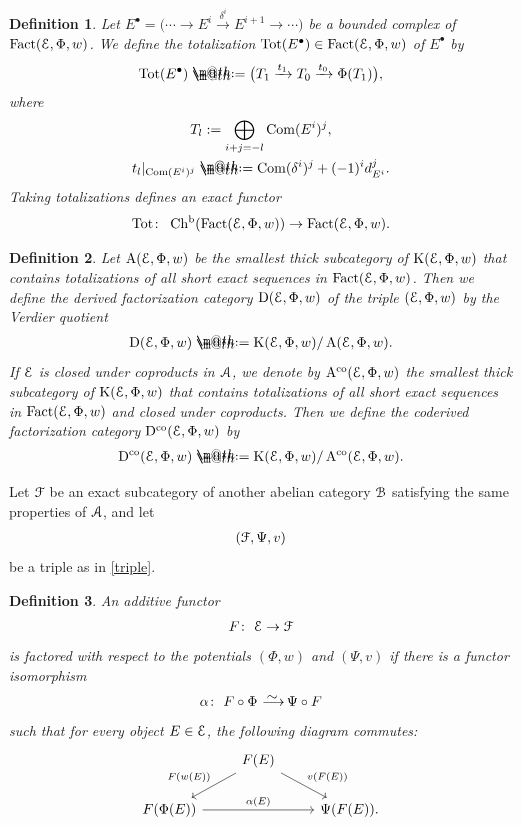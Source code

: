 \documentclass[pdftex]{sigma}%
\makeatletter
\newtheorem{dfn}{Definition}[section]
\newcommand*{\defeq}{\mathrel{\rlap{%
 \raisebox{0.3ex}{$\m@th\cdot$}}%
 \raisebox{-0.3ex}{$\m@th\cdot$}}%
 =}
\numberwithin{equation}{section}
\newcommand{\Chb}{\operatorname{Ch^{b}}}
\newcommand{\Fact}{\operatorname{Fact}}
\newcommand{\Tot}{\operatorname{Tot}}
\newcommand{\Dco}{\operatorname{D^{co}}}
\newcommand{\D}{\operatorname{D}}
\newcommand{\Aco}{\operatorname{A^{co}}}
\newcommand{\A}{\operatorname{A}}
\newcommand{\K}{\operatorname{K}}
\newcommand{\scrA}{\EuScript{A}}
\newcommand{\scrB}{\EuScript{B}}
\newcommand{\scrE}{\EuScript{E}}
\newcommand{\scrF}{\EuScript{F}}
\newcommand{\simto}{\,\,\,\,\raisebox{4pt}{$\sim$}{\kern -1.1em \longrightarrow}\,}
\makeatother
\begin{document}
\begin{dfn}
Let $E^{\bullet}=\big(\cdots\rightarrow E^i\xrightarrow{\delta^i}E^{i+1}\rightarrow\cdots\big)$ be a bounded complex of $\Fact(\scrE,\Phi,w)$. We define the {\it totalization} $\Tot(E^{\bullet})\in\Fact(\scrE,\Phi,w)$ of $E^{\bullet}$ by
\begin{gather*}
{\rm Tot}(E^{\bullet})\defeq\big(T_1\xrightarrow{t_1}T_0\xrightarrow{t_0}\Phi(T_1)\big),
\end{gather*}
where
\begin{gather*}
T_l:=\bigoplus_{i+j=-l}{\rm Com}(E^i)^j,
\\
t_l|_{{\rm Com}(E^i)^j}\defeq{\rm Com}(\delta^i)^j+(-1)^id_{E^i}^j.
\end{gather*}
Taking totalizations defines an exact functor
\begin{gather*}
\Tot\colon\ \Chb(\Fact(\scrE,\Phi,w))\rightarrow \Fact(\scrE,\Phi,w).
\end{gather*}
\end{dfn}

\begin{dfn}
Let $\A(\scrE,\Phi,w)$ be the smallest thick subcategory of $\K(\scrE,\Phi,w)$ that contains tota\-lizations of all short exact sequences in $\Fact(\scrE,\Phi,w)$. Then we define the {\it derived factorization category} $\D(\scrE,\Phi,w)$ of the triple $(\scrE,\Phi,w)$ by the Verdier quotient
\begin{gather*}
\D(\scrE,\Phi,w)\defeq\K(\scrE,\Phi,w)/\A(\scrE,\Phi,w).
\end{gather*}
If $\scrE$ is closed under coproducts in $\scrA$, we denote by
$\Aco(\scrE,\Phi,w)$ the smallest thick subcategory of $\K(\scrE,\Phi,w)$ that contains totalizations of all short exact sequences in $\Fact(\scrE,\Phi,w)$ and closed under coproducts. Then we define the {\it coderived factorization category} $\Dco(\scrE,\Phi,w)$ by
\begin{gather*}
\Dco(\scrE,\Phi,w)\defeq\K(\scrE,\Phi,w)/\Aco(\scrE,\Phi,w).
\end{gather*}
\end{dfn}

Let $\scrF$ be an exact subcategory of another abelian category $\scrB$ satisfying the same properties of $\scrA$, and let
\begin{gather*}
(\scrF,\Psi,v)
\end{gather*} be a triple as in \eqref{triple}.

\begin{dfn} An additive functor
\begin{gather*}
F\colon\ \scrE \to \scrF
\end{gather*}
is {\it factored} with respect to the potentials $(\Phi,w)$ and $(\Psi,v)$ if there is a functor isomorphism
\begin{gather*}
\alpha\colon\ F\circ \Phi \simto \Psi\circ F
\end{gather*}
such that for every object $E\in \scrE$, the following diagram commutes:
\[
\begin{tikzcd}
&F(E)\arrow[ld, "F(w(E))"']\arrow[rd, "v(F(E))"]&\\
F(\Phi(E))\arrow[rr, "\alpha(E)"]&& \Psi(F(E)).
\end{tikzcd}
\]
\end{dfn}
\end{document}
